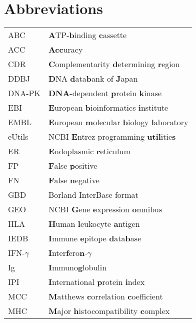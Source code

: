 \chapter*{Abbreviations}
\label{cha:abbreviation}

\begin{table} [h] { 
\small
\begin{tabular}{l l}
ABC & \textbf{A}TP-\textbf{b}inding \textbf{c}assette\\
ACC & \textbf{Acc}uracy\\
CDR & \textbf{C}omplementarity \textbf{d}etermining \textbf{r}egion\\
DDBJ & \textbf{D}NA \textbf{d}ata\textbf{b}ank of \textbf{J}apan\\
DNA-PK & \textbf{DNA}-dependent \textbf{p}rotein \textbf{k}inase\\
EBI & \textbf{E}uropean \textbf{b}ioinformatics \textbf{i}nstitute\\
EMBL & \textbf{E}uropean \textbf{m}olecular \textbf{b}iology \textbf{l}aboratory\\
eUtils & NCBI \textbf{E}ntrez programming \textbf{util}itie\textbf{s}\\
ER & \textbf{E}ndoplasmic \textbf{r}eticulum\\
FP & \textbf{F}alse \textbf{p}ositive\\
FN & \textbf{F}alse \textbf{n}egative\\
GBD & Borland InterBase format\\
GEO & NCBI \textbf{G}ene \textbf{e}xpression \textbf{o}mnibus\\
HLA & \textbf{H}uman \textbf{l}eukocyte \textbf{a}ntigen\\
IEDB & \textbf{I}mmune \textbf{e}pitope \textbf{d}ata\textbf{b}ase\\
IFN-$\gamma$ & \textbf{I}nter\textbf{f}ero\textbf{n}-\textbf{$\gamma$}\\
Ig & \textbf{I}mmuno\textbf{g}lobulin\\
IPI & \textbf{I}nternational \textbf{p}rotein \textbf{i}ndex\\
MCC & \textbf{M}atthews \textbf{c}orrelation \textbf{c}oefficient\\
MHC & \textbf{M}ajor \textbf{h}istocompatibility \textbf{c}omplex\\

\end{tabular}}
\end{table}
